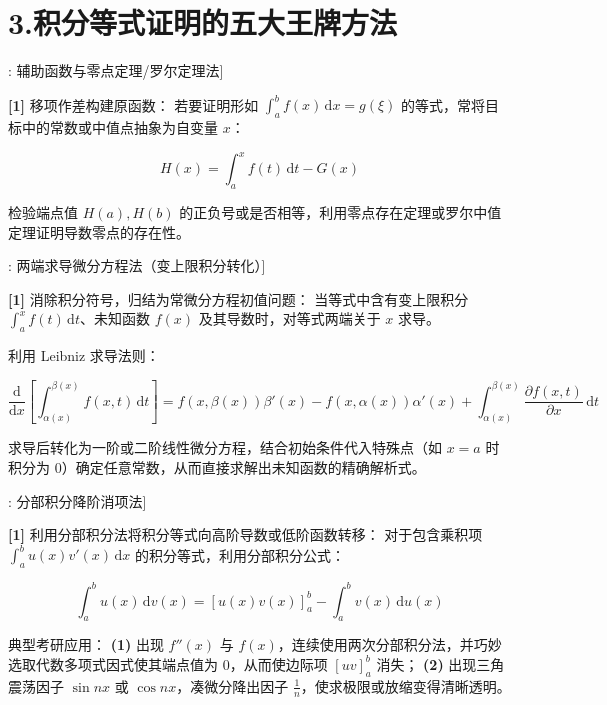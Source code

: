 \documentclass[11pt,a4paper,UTF8]{ctexart}
\begin{document}
\section{3.积分等式证明的五大王牌方法}

\begin{thmbox}[方法[3]: 辅助函数与零点定理/罗尔定理法]

\textbf{[1]} 移项作差构建原函数：
若要证明形如 $\int_a^b f(x)\,\mathrm{d}x = g(\xi)$ 的等式，常将目标中的常数或中值点抽象为自变量 $x$：


\begin{equation*}
H(x) = \int_a^x f(t)\,\mathrm{d}t - G(x)
\end{equation*}


检验端点值 $H(a), H(b)$ 的正负号或是否相等，利用零点存在定理或罗尔中值定理证明导数零点的存在性。

\end{thmbox}
\begin{thmbox}[方法[4]: 两端求导微分方程法（变上限积分转化）]

\textbf{[1]} 消除积分符号，归结为常微分方程初值问题：
当等式中含有变上限积分 $\int_a^x f(t)\,\mathrm{d}t$、未知函数 $f(x)$ 及其导数时，对等式两端关于 $x$ 求导。

利用 Leibniz 求导法则：


\begin{equation*}
\frac{\mathrm{d}}{\mathrm{d}x}\left[\int_{\alpha(x)}^{\beta(x)} f(x, t)\,\mathrm{d}t\right] = f(x, \beta(x))\beta'(x) - f(x, \alpha(x))\alpha'(x) + \int_{\alpha(x)}^{\beta(x)} \frac{\partial f(x, t)}{\partial x}\,\mathrm{d}t
\end{equation*}


求导后转化为一阶或二阶线性微分方程，结合初始条件代入特殊点（如 $x=a$ 时积分为 0）确定任意常数，从而直接求解出未知函数的精确解析式。

\end{thmbox}
\begin{thmbox}[方法[5]: 分部积分降阶消项法]

\textbf{[1]} 利用分部积分法将积分等式向高阶导数或低阶函数转移：
对于包含乘积项 $\int_a^b u(x)v'(x)\,\mathrm{d}x$ 的积分等式，利用分部积分公式：


\begin{equation*}
\int_a^b u(x)\,\mathrm{d}v(x) = [u(x)v(x)]_a^b - \int_a^b v(x)\,\mathrm{d}u(x)
\end{equation*}


典型考研应用：
\textbf{(1)}  出现 $f''(x)$ 与 $f(x)$，连续使用两次分部积分法，并巧妙选取代数多项式因式使其端点值为 0，从而使边际项 $[uv]_a^b$ 消失；
\textbf{(2)}  出现三角震荡因子 $\sin nx$ 或 $\cos nx$，凑微分降出因子 $\frac{1}{n}$，使求极限或放缩变得清晰透明。

\end{thmbox}
\end{document}
